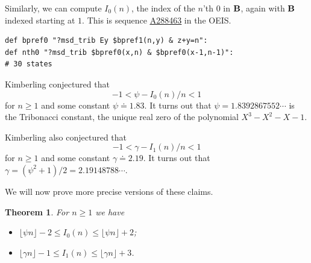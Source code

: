 \documentclass[
final
]{dmtcs-episciences}
\newcommand{\seqnum}[1]{\href{https://oeis.org/#1}{\rm \underline{#1}}}
\theoremstyle{plain}
\newtheorem{theorem}{Theorem}
\theoremstyle{definition}
\theoremstyle{remark}
\begin{document}
Similarly, we can compute $I_0 (n)$, the index of the $n$'th $0$ in
$\bf B$, again with $\bf B$ indexed starting at $1$.  This is sequence \seqnum{A288463} in the OEIS.
\begin{verbatim}
def bpref0 "?msd_trib Ey $bpref1(n,y) & z+y=n":
def nth0 "?msd_trib $bpref0(x,n) & $bpref0(x-1,n-1)":
# 30 states
\end{verbatim}

Kimberling conjectured that 
$$ -1 < \psi  - I_0(n)/n < 1$$
for $n \geq 1$ and some constant $\psi \doteq 1.83$.  It turns out
that $\psi = 1.8392867552\cdots$ is the Tribonacci constant, the unique real zero of the polynomial
$X^3-X^2-X-1$.

Kimberling also conjectured that
$$ -1 < \gamma - I_1(n)/n < 1$$
for $n \geq 1$ and some constant $\gamma \doteq 2.19$.  It turns out
that $\gamma = (\psi^2 + 1)/2 = 2.19148788\cdots $.

We will now prove more precise versions of these claims.
\begin{theorem}
For $n \geq 1$ we have
\begin{itemize}
\item[(a)] $\lfloor \psi n \rfloor - 2 \leq I_0(n)  \leq 
\lfloor \psi n \rfloor + 2$;
\item[(b)] $\lfloor \gamma n \rfloor -1 \leq 
I_1 (n) \leq \lfloor \gamma n \rfloor + 3$.
\end{itemize}
\end{theorem}
\end{document}

